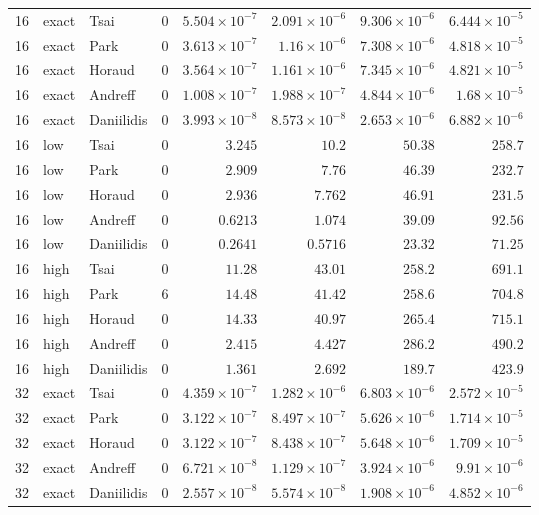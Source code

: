 \begin{longtable}{rllrrrrr}
16 & exact & Tsai & 0 & $5.504\times10^{-7}$ & $2.091\times10^{-6}$ & $9.306\times10^{-6}$ & $6.444\times10^{-5}$ \\
16 & exact & Park & 0 & $3.613\times10^{-7}$ & $1.16\times10^{-6}$ & $7.308\times10^{-6}$ & $4.818\times10^{-5}$ \\
16 & exact & Horaud & 0 & $3.564\times10^{-7}$ & $1.161\times10^{-6}$ & $7.345\times10^{-6}$ & $4.821\times10^{-5}$ \\
16 & exact & Andreff & 0 & $1.008\times10^{-7}$ & $1.988\times10^{-7}$ & $4.844\times10^{-6}$ & $1.68\times10^{-5}$ \\
16 & exact & Daniilidis & 0 & $3.993\times10^{-8}$ & $8.573\times10^{-8}$ & $2.653\times10^{-6}$ & $6.882\times10^{-6}$ \\
16 & low & Tsai & 0 & $3.245$ & $10.2$ & $50.38$ & $258.7$ \\
16 & low & Park & 0 & $2.909$ & $7.76$ & $46.39$ & $232.7$ \\
16 & low & Horaud & 0 & $2.936$ & $7.762$ & $46.91$ & $231.5$ \\
16 & low & Andreff & 0 & $0.6213$ & $1.074$ & $39.09$ & $92.56$ \\
16 & low & Daniilidis & 0 & $0.2641$ & $0.5716$ & $23.32$ & $71.25$ \\
16 & high & Tsai & 0 & $11.28$ & $43.01$ & $258.2$ & $691.1$ \\
16 & high & Park & 6 & $14.48$ & $41.42$ & $258.6$ & $704.8$ \\
16 & high & Horaud & 0 & $14.33$ & $40.97$ & $265.4$ & $715.1$ \\
16 & high & Andreff & 0 & $2.415$ & $4.427$ & $286.2$ & $490.2$ \\
16 & high & Daniilidis & 0 & $1.361$ & $2.692$ & $189.7$ & $423.9$ \\
32 & exact & Tsai & 0 & $4.359\times10^{-7}$ & $1.282\times10^{-6}$ & $6.803\times10^{-6}$ & $2.572\times10^{-5}$ \\
32 & exact & Park & 0 & $3.122\times10^{-7}$ & $8.497\times10^{-7}$ & $5.626\times10^{-6}$ & $1.714\times10^{-5}$ \\
32 & exact & Horaud & 0 & $3.122\times10^{-7}$ & $8.438\times10^{-7}$ & $5.648\times10^{-6}$ & $1.709\times10^{-5}$ \\
32 & exact & Andreff & 0 & $6.721\times10^{-8}$ & $1.129\times10^{-7}$ & $3.924\times10^{-6}$ & $9.91\times10^{-6}$ \\
32 & exact & Daniilidis & 0 & $2.557\times10^{-8}$ & $5.574\times10^{-8}$ & $1.908\times10^{-6}$ & $4.852\times10^{-6}$ \\

\end{longtable}
